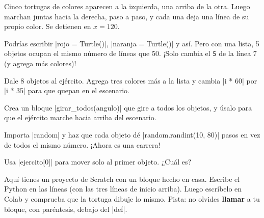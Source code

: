 Cinco tortugas de colores aparecen a la izquierda, una arriba de la otra. Luego marchan juntas hacia la derecha, paso a paso, y cada una deja una línea de su propio color. Se detienen en $x = 120$.

\begin{think}
Podrías escribir \py|rojo = Turtle()|, \py|naranja = Turtle()| y así. Pero con una lista, 5 objetos ocupan el mismo número de líneas que 50. ¡Solo cambia el \texttt{5} de la línea 7 (y agrega más colores)!
\end{think}

\begin{challenge}
\tick Dale 8 objetos al ejército. Agrega tres colores más a la lista y cambia \py|i * 60| por \py|i * 35| para que quepan en el escenario.\par
\tick Crea un bloque \py|girar_todos(angulo)| que gire a todos los objetos, y úsalo para que el ejército marche hacia arriba del escenario.\par
\tick Importa \py|random| y haz que cada objeto dé \py|random.randint(10, 80)| pasos en vez de todos el mismo número. ¡Ahora es una carrera!\par
\tick Usa \py|ejercito[0]| para mover solo al primer objeto. ¿Cuál es?
\end{challenge}


Aquí tienes un proyecto de Scratch con un bloque hecho en casa. Escribe el Python en las líneas (con las tres líneas de inicio arriba). Luego escríbelo en Colab y comprueba que la tortuga dibuje lo mismo. Pista: no olvides \textbf{llamar} a tu bloque, con paréntesis, debajo del \py|def|.

